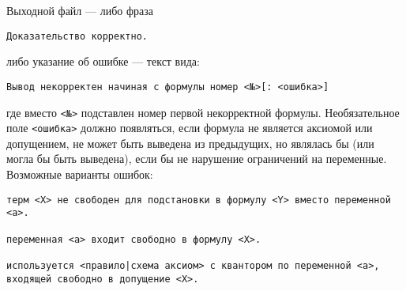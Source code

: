 \documentclass[11pt,a4paper,oneside]{article}
\begin{document}
Выходной файл --- либо фраза 
\begin{verbatim}Доказательство корректно.\end{verbatim}
либо указание об ошибке --- текст вида: 
\begin{verbatim}
Вывод некорректен начиная с формулы номер <№>[: <ошибка>]
\end{verbatim}
где вместо \texttt{<№>} подставлен номер первой некорректной формулы. Необязательное поле
\texttt{<ошибка>} должно появляться, если формула не является аксиомой или допущением,
не может быть выведена из предыдущих, но являлась бы (или могла бы быть выведена), 
если бы не нарушение ограничений на переменные. Возможные варианты ошибок:
\begin{verbatim}
терм <X> не свободен для подстановки в формулу <Y> вместо переменной <a>.

переменная <a> входит свободно в формулу <X>.

используется <правило|схема аксиом> с квантором по переменной <a>, 
входящей свободно в допущение <X>.
\end{verbatim}
\end{document}

